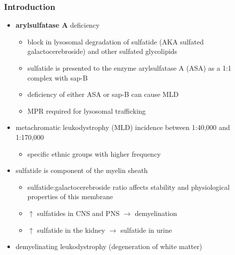 \documentclass[12pt]{scrartcl}
\begin{document}
\subsubsection{Introduction}
\label{sec:orge6bb858}
\begin{itemize}
\item \textbf{arylsulfatase A} deficiency
\begin{itemize}
\item block in lysosomal degradation of sulfatide (AKA sulfated
galactocerebroside) and other sulfated glycolipids
\item sulfatide is presented to the enzyme arylsulfatase A (ASA) as a
1:1 complex with sap-B
\item deficiency of either ASA or sap-B can cause MLD
\item MPR required for lysosomal trafficking
\end{itemize}
\item metachromatic leukodystrophy (MLD) incidence between 1:40,000 and 1:170,000
\begin{itemize}
\item specific ethnic groups with higher frequency
\end{itemize}

\item sulfatide is component of the myelin sheath
\begin{itemize}
\item sulfatide:galactocerebroside ratio affects stability and
physiological properties of this membrane
\item \(\uparrow\) sulfatides in CNS and PNS \(\to\) demyelination
\item \(\uparrow\) sulfatide in the kidney \(\to\) sulfatide in urine
\end{itemize}
\item demyelinating leukodystrophy (degeneration of white matter)
\end{itemize}
\end{document}
